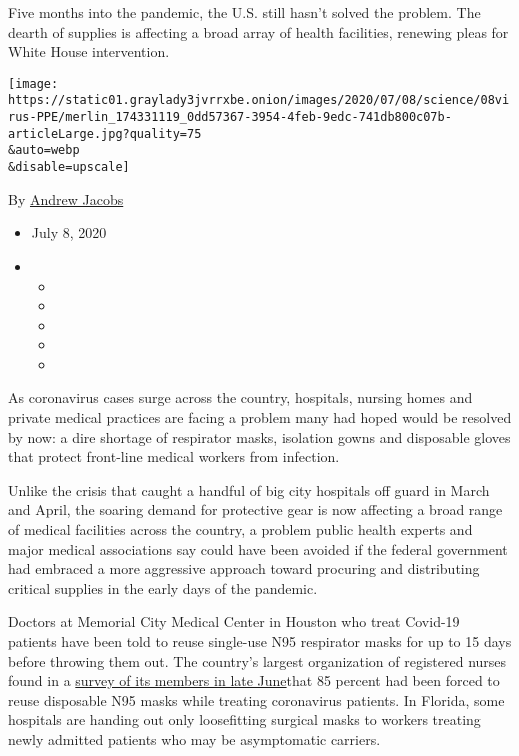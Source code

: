 Five months into the pandemic, the U.S. still hasn't solved the problem.
The dearth of supplies is affecting a broad array of health facilities,
renewing pleas for White House intervention.

\texttt{[image: https://static01.graylady3jvrrxbe.onion/images/2020/07/08/science/08virus-PPE/merlin\_174331119\_0dd57367-3954-4feb-9edc-741db800c07b-articleLarge.jpg?quality=75\\\&auto=webp\\\&disable=upscale]}

By \href{https://www.nytimes3xbfgragh.onion/by/andrew-jacobs}{Andrew
Jacobs}

\begin{itemize}
\item
  July 8, 2020
\item
  \begin{itemize}
  \item
  \item
  \item
  \item
  \item
  \end{itemize}
\end{itemize}

As coronavirus cases surge across the country, hospitals, nursing homes
and private medical practices are facing a problem many had hoped would
be resolved by now: a dire shortage of respirator masks, isolation gowns
and disposable gloves that protect front-line medical workers from
infection.

Unlike the crisis that caught a handful of big city hospitals off guard
in March and April, the soaring demand for protective gear is now
affecting a broad range of medical facilities across the country, a
problem public health experts and major medical associations say could
have been avoided if the federal government had embraced a more
aggressive approach toward procuring and distributing critical supplies
in the early days of the pandemic.

Doctors at Memorial City Medical Center in Houston who treat Covid-19
patients have been told to reuse single-use N95 respirator masks for up
to 15 days before throwing them out. The country's largest organization
of registered nurses found in a
\href{https://www.nationalnursesunited.org/covid-19-survey}{survey of
its members in late June}that 85 percent had been forced to reuse
disposable N95 masks while treating coronavirus patients. In Florida,
some hospitals are handing out only loosefitting surgical masks to
workers treating newly admitted patients who may be asymptomatic
carriers.

